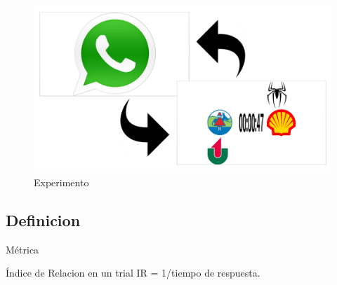 \documentclass{beamer}
\begin{document}
\begin{frame}
\begin{figure}[h]
 \centering
  \begin{minipage}[c]{1\textwidth}
	\centering	
	\includegraphics[scale=0.16]{exp.png}
        \caption{Experimento}
  \end{minipage}
\end{figure}
\end{frame}


\subsection{Definicion}

\begin{frame}{Métrica}
\begin{block}{Índice de Relacion en un trial}
IR = 1/tiempo de respuesta. 
\end{block}




\end{frame}
\end{document}
